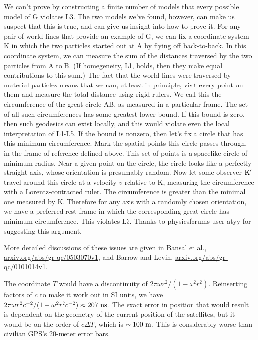 We can't prove by constructing a finite number of models that every possible model of G violates L3. The two models we've found, however,
can make us suspect that this is true, and can give us insight into how to prove it. For any pair of world-lines that
provide an example of G, we can fix a coordinate system K in which the two particles started out at A by flying off back-to-back.
In this coordinate system, we can measure the sum of the distances traversed by the two particles from A to B. (If homegeneity, L1,
holds, then they make equal contributions to this sum.) The fact that the world-lines were traversed by material particles
means that we can, at least in principle, visit every point on them and measure the total distance using rigid rulers.
We call this the circumference of the great circle AB, as measured in a particular frame.
The set of all such circumferences has some greatest lower bound. If this bound is zero, then such geodesics can exist locally, and
this would violate even the local interpretation of L1-L5. If the bound is nonzero, then let's fix a circle that has
this minimum circumference. Mark the spatial points this circle passes through, in the frame of reference defined above.
This set of points is a spacelike circle of minimum radius. Near a given point on the circle, the circle looks like
a perfectly straight axis, whose orientation is presumably random. Now let some observer $\textup{K}'$ travel around this circle at a velocity
$v$ relative to K, measuring the circumference with a Lorentz-contracted ruler. The circumference is greater than the minimal
one measured by K. Therefore for any axis with a randomly chosen orientation, we have a preferred rest frame in which the
corresponding great circle has minimum circumference. This violates L3. Thanks to physicsforums user atyy for suggesting this
argument.

More detailed discussions of these issues are given in Bansal et al., \url{arxiv.org/abs/gr-qc/0503070v1},
and Barrow and Levin, \url{arxiv.org/abs/gr-qc/0101014v1}.


The coordinate $T$ would have a discontinuity of $2\pi\omega r^2/(1-\omega^2 r^2)$. Reinserting factors of $c$ to make it work
out in SI units, we have $2\pi\omega r^2 c^{-2}/(1-\omega^2 r^2 c^{-2}) \approx 207\ \textup{ns}$. The exact error in position that
would result is dependent on the geometry of the current position of the satellites, but it would be on the order of $c\Delta T$,
which is $\sim 100\ \textup{m}$. This is considerably worse than civilian GPS's 20-meter error bars.

